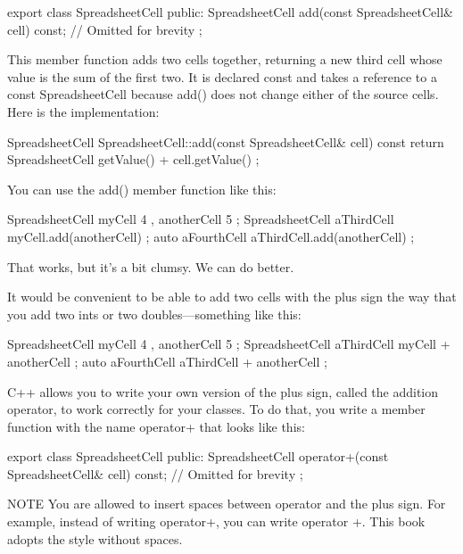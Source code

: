 \begin{cpp}
export class SpreadsheetCell
{
    public:
        SpreadsheetCell add(const SpreadsheetCell& cell) const;
        // Omitted for brevity
};
\end{cpp}

This member function adds two cells together, returning a new third cell whose value is the sum of the first two. It is declared const and takes a reference to a const SpreadsheetCell because add() does not change either of the source cells. Here is the implementation:

\begin{cpp}
SpreadsheetCell SpreadsheetCell::add(const SpreadsheetCell& cell) const
{
    return SpreadsheetCell { getValue() + cell.getValue() };
}
\end{cpp}

You can use the add() member function like this:

\begin{cpp}
SpreadsheetCell myCell { 4 }, anotherCell { 5 };
SpreadsheetCell aThirdCell { myCell.add(anotherCell) };
auto aFourthCell { aThirdCell.add(anotherCell) };
\end{cpp}

That works, but it’s a bit clumsy. We can do better.


It would be convenient to be able to add two cells with the plus sign the way that you add two ints or two doubles—something like this:

\begin{cpp}
SpreadsheetCell myCell { 4 }, anotherCell { 5 };
SpreadsheetCell aThirdCell { myCell + anotherCell };
auto aFourthCell { aThirdCell + anotherCell };
\end{cpp}

C++ allows you to write your own version of the plus sign, called the addition operator, to work correctly for your classes. To do that, you write a member function with the name operator+ that looks like this:

\begin{cpp}
export class SpreadsheetCell
{
    public:
        SpreadsheetCell operator+(const SpreadsheetCell& cell) const;
        // Omitted for brevity
};
\end{cpp}

\begin{myNotic}{NOTE}
You are allowed to insert spaces between operator and the plus sign. For example, instead of writing operator+, you can write operator +. This book adopts the style without spaces.
\end{myNotic}

